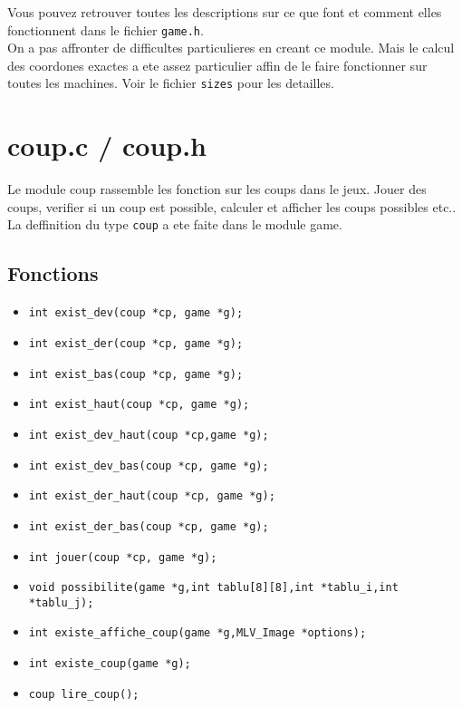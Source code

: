 \documentclass[11pt,a4paper]{article}
\begin{document}
Vous pouvez retrouver toutes les descriptions sur ce que font et comment elles fonctionnent dans le fichier \texttt{game.h}.
\\
On a pas affronter de difficultes particulieres en creant ce module. Mais le calcul des coordones exactes a ete assez particulier affin de le faire fonctionner sur toutes les machines. Voir le fichier \texttt{sizes} pour les detailles.
\newpage
\section{coup.c / coup.h}

Le module coup rassemble les fonction sur les coups dans le jeux. Jouer des coups, verifier si un coup est possible, calculer et afficher les coups possibles etc..
\\
La deffinition du type \texttt{coup} a ete faite dans le module game.

\subsection{Fonctions}

\begin{itemize}
  
\item \texttt{int exist\_dev(coup *cp, game *g);}
\item \texttt{int exist\_der(coup *cp, game *g);}
\item \texttt{int exist\_bas(coup *cp, game *g);}
\item \texttt{int exist\_haut(coup *cp, game *g);}
\item \texttt{int exist\_dev\_haut(coup *cp,game *g);}
\item \texttt{int exist\_dev\_bas(coup *cp, game *g);}
\item \texttt{int exist\_der\_haut(coup *cp, game *g);}
\item \texttt{int exist\_der\_bas(coup *cp, game *g);}
\item \texttt{int jouer(coup *cp, game *g);}
\item \texttt{void possibilite(game *g,int tablu[8][8],int *tablu\_i,int *tablu\_j);}
\item \texttt{int existe\_affiche\_coup(game *g,MLV\_Image *options);}
\item \texttt{int existe\_coup(game *g);}
\item \texttt{coup lire\_coup();}

\end{itemize}
\end{document}
